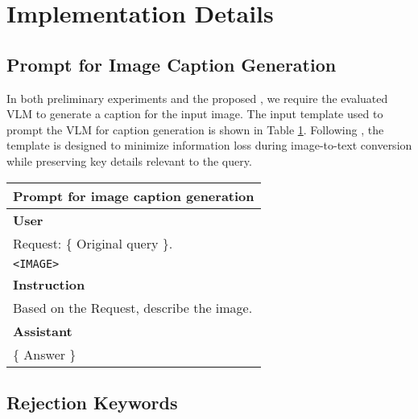 \section{Implementation Details} \label{appendix-implementation}

\subsection{Prompt for Image Caption Generation}

In both preliminary experiments and the proposed \OursMethod, we require the evaluated VLM to generate a caption for the input image. The input template used to prompt the VLM for caption generation is shown in Table \ref{tab:image-caption-prompt}. Following \cite{gou2025eyes}, the template is designed to minimize information loss during image-to-text conversion while preserving key details relevant to the query.

\begin{table}[h]
    \renewcommand{\arraystretch}{1.4} %
    \setlength{\arrayrulewidth}{0.8pt} %
    \centering

    \label{tab:image-caption-prompt}
    
    \begin{tabular}{|p{14cm}|}
        \hline
        \rowcolor[gray]{0.8} \textbf{Prompt for image caption generation} \\
        
        \hline
        
        \textbf{User} \\
        
        Request: \{ Original query \}. \\
        \texttt{<IMAGE>} \\

        \hline
        \textbf{Instruction} \\
        Based on the Request, describe the image.  \\ 
        \hline
        
        \textbf{Assistant} \\
        \{ Answer \} \\
        \hline
    \end{tabular}
\end{table}

\subsection{Rejection Keywords}

